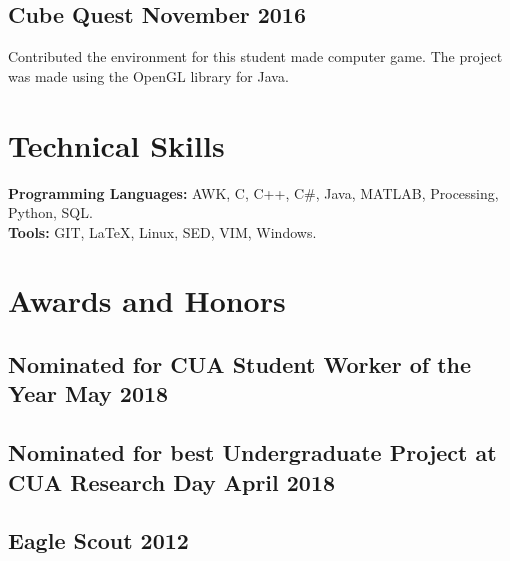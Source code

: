 \documentclass[12pt, letterpaper]{article}
\begin{document}
\subsection{Cube Quest \hfill November 2016}
\justify
Contributed the environment for this student made computer game.
The project was made using the OpenGL library for Java.

\section{Technical Skills}
\textbf{Programming Languages:}
AWK,
C,
C++,
C\#,
Java,
MATLAB,
Processing,
Python,
SQL.\\
\textbf{Tools:}
GIT,
\LaTeX,
Linux,
SED,
VIM,
Windows.

\section{Awards and Honors}
\subsection{Nominated for CUA Student Worker of the Year \hfill May 2018}
\subsection{Nominated for best Undergraduate Project at CUA Research Day \hfill April 2018}
\subsection{Eagle Scout \hfill 2012}
\end{document}
